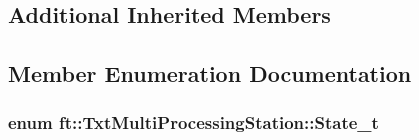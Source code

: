 \subsection*{Additional Inherited Members}


\subsection{Member Enumeration Documentation}
\subsubsection[{\texorpdfstring{State\+\_\+t}{State_t}}]{\setlength{\rightskip}{0pt plus 5cm}enum {\bf ft\+::\+Txt\+Multi\+Processing\+Station\+::\+State\+\_\+t}}\hypertarget{classft_1_1_txt_multi_processing_station_a345fc850c7a3fd9062de2286a716fd2e}{}\label{classft_1_1_txt_multi_processing_station_a345fc850c7a3fd9062de2286a716fd2e}
